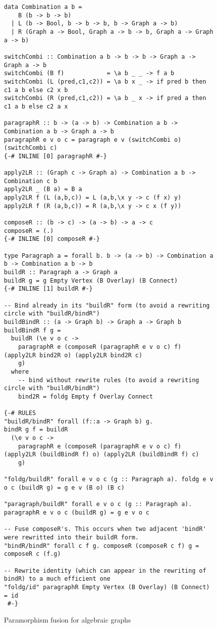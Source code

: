 
\begin{figure*}
\begin{verbatim}
data Combination a b =
    B (b -> b -> b)
  | L (b -> Bool, b -> b -> b, b -> Graph a -> b)
  | R (Graph a -> Bool, Graph a -> b -> b, Graph a -> Graph a -> b)

switchCombi :: Combination a b -> b -> b -> Graph a -> Graph a -> b
switchCombi (B f)            = \a b _ _ -> f a b
switchCombi (L (pred,c1,c2)) = \a b x _ -> if pred b then c1 a b else c2 x b
switchCombi (R (pred,c1,c2)) = \a b _ x -> if pred a then c1 a b else c2 a x
  
paragraphR :: b -> (a -> b) -> Combination a b -> Combination a b -> Graph a -> b
paragraphR e v o c = paragraph e v (switchCombi o) (switchCombi c)
{-# INLINE [0] paragraphR #-}

apply2LR :: (Graph c -> Graph a) -> Combination a b -> Combination c b
apply2LR _ (B a) = B a
apply2LR f (L (a,b,c)) = L (a,b,\x y -> c (f x) y)
apply2LR f (R (a,b,c)) = R (a,b,\x y -> c x (f y))

composeR :: (b -> c) -> (a -> b) -> a -> c
composeR = (.)
{-# INLINE [0] composeR #-}

type Paragraph a = forall b. b -> (a -> b) -> Combination a b -> Combination a b -> b
buildR :: Paragraph a -> Graph a
buildR g = g Empty Vertex (B Overlay) (B Connect)
{-# INLINE [1] buildR #-}

-- Bind already in its "buildR" form (to avoid a rewriting circle with "buildR/bindR")
buildBindR :: (a -> Graph b) -> Graph a -> Graph b
buildBindR f g = 
  buildR (\e v o c -> 
    paragraphR e (composeR (paragraphR e v o c) f) (apply2LR bind2R o) (apply2LR bind2R c) 
    g)
  where
    -- bind without rewrite rules (to avoid a rewriting circle with "buildR/bindR")
    bind2R = foldg Empty f Overlay Connect
    
{-# RULES
"buildR/bindR" forall (f::a -> Graph b) g.
bindR g f = buildR 
  (\e v o c -> 
    paragraphR e (composeR (paragraphR e v o c) f) (apply2LR (buildBindR f) o) (apply2LR (buildBindR f) c)
    g)

"foldg/buildR" forall e v o c (g :: Paragraph a). foldg e v o c (buildR g) = g e v (B o) (B c)

"paragraph/buildR" forall e v o c (g :: Paragraph a). paragraphR e v o c (buildR g) = g e v o c

-- Fuse composeR's. This occurs when two adjacent 'bindR' were rewritted into their buildR form.
"bindR/bindR" forall c f g. composeR (composeR c f) g = composeR c (f.g)

-- Rewrite identity (which can appear in the rewriting of bindR) to a much efficient one
"foldg/id" paragraphR Empty Vertex (B Overlay) (B Connect) = id
 #-}
\end{verbatim}
\caption{Paramorphism fusion for algebraic graphs}
\label{fig:parafus}
\end{figure*}
